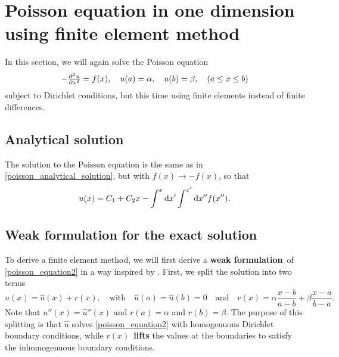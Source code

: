 \section{Poisson equation in one dimension using finite element method}

\newcommand\basisexpand[2]{\sum_{i=0}^{M+1} #1_i \varphi_i(#2)}

In this section, we will again solve the Poisson equation
\begin{equation}
	-\pd[2]{u}{x} = f(x), \quad u(a) = \alpha, \quad u(b) = \beta, \quad (a \leq x \leq b)
	\label{poisson_equation2}
\end{equation}
subject to Dirichlet conditions, but this time using finite elements instead of finite differences.

\subsection{Analytical solution}

The solution to the Poisson equation is the same as in \ref{poisson_analytical_solution}, but with $f(x) \rightarrow -f(x)$, so that
\begin{equation}
u(x) = C_1 + C_2 x - \int^x \dif x' \int^{x'} \dif x'' f(x'').
\label{poisson_analytical_solution2}
\end{equation}

\subsection{Weak formulation for the exact solution}

To derive a finite element method, we will first derive a \textbf{weak formulation} of \ref{poisson_equation2} in a way inspired by \cite{curry}.
First, we split the solution into two terms
\begin{equation}
	u(x) = \hat{u}(x) + r(x), \quad \text{with} \quad \hat{u}(a) = \hat{u}(b) = 0 \quad \text{and} \quad r(x) = \alpha \frac{x-b}{a-b} + \beta \frac{x-a}{b-a}.
	\label{splitting_exact}
\end{equation}
Note that $u''(x) = \hat{u}''(x)$ and $r(a) = \alpha$ and $r(b) = \beta$.
The purpose of this splitting is that $\hat{u}$ solves \ref{poisson_equation2} with homogenuous Dirichlet boundary conditions, while $r(x)$ \textbf{lifts} the values at the boundaries to satisfy the inhomogenuous boundary conditions.

